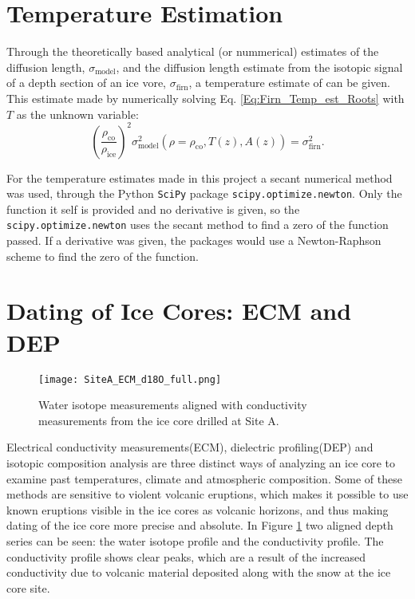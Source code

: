 \documentclass[../../CompleteThesis2/Complete_2ndDraft]{subfiles}
\begin{document}
\section[Temperature Estimation]{Temperature Estimation}
\label{Sec:Ice_TempEstimation}

Through the theoretically based analytical (or nummerical) estimates of the diffusion length, $\sigma_{\text{model}}$, and the diffusion length estimate from the isotopic signal of a depth section of an ice vore, $\sigma_{\text{firn}}$, a temperature estimate of can be given. This estimate made by numerically solving Eq. \ref{Eq:Firn_Temp_est_Roots} with $T$ as the unknown variable:
\begin{equation}
	\left(\frac{\rho_{\text{co}}}{\rho_{\text{ice}}}\right)^2 \sigma_{\text{model}}^2(\rho=\rho_{\text{co}}, T(z), A(z)) = \sigma^2_{\text{firn}}.
	\label{Eq:Firn_Temp_est_Roots2}
\end{equation}

For the temperature estimates made in this project a secant numerical method\cite{Press2007} was used, through the Python \lstinline[language=Python]|SciPy| package \lstinline[language=Python]|scipy.optimize.newton|. Only the function it self is provided and no derivative is given, so the \lstinline[language=Python]|scipy.optimize.newton| uses the secant method to find a zero of the function passed. If a derivative was given, the packages would use a Newton-Raphson\cite{Press2007} scheme to find the zero of the function.






\section[ECM and DEP][ECM and DEP]{Dating of Ice Cores: ECM and DEP}
\label{Sec:Ice_ECMandDEP}

\begin{figure}[h]
	\centering
	\texttt{[image: SiteA\_ECM\_d18O\_full.png]}
	\caption[Conductivity and $\delta^{18}$O measurements from Site A.]{\small Water isotope measurements aligned with conductivity measurements from the ice core drilled at Site A.}
	\label{Fig:ICE_SiteA_ECM_d18O_full}
\end{figure}

Electrical conductivity measurements(ECM), dielectric profiling(DEP) and isotopic composition analysis are three distinct ways of analyzing an ice core to examine past temperatures, climate and atmospheric composition. Some of these methods are sensitive to violent volcanic eruptions, which makes it possible to use known eruptions visible in the ice cores as volcanic horizons, and thus making dating of the ice core more precise and absolute. In Figure \ref{Fig:ICE_SiteA_ECM_d18O_full} two aligned depth series can be seen: the water isotope profile and the conductivity profile. The conductivity profile shows clear peaks, which are a result of the increased conductivity due to volcanic material deposited along with the snow at the ice core site.
\end{document}
